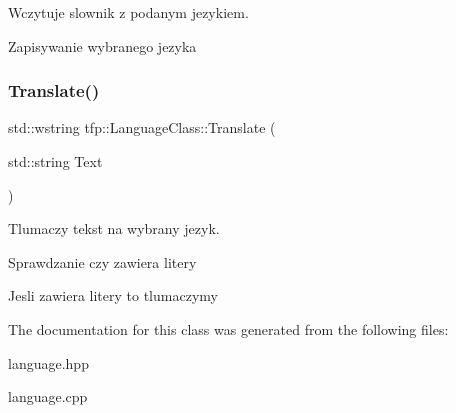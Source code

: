 Wczytuje slownik z podanym jezykiem. 

Zapisywanie wybranego jezyka \mbox{\label{classtfp_1_1_language_class_a8b0c58a37384663539c7ef40388521c1}} 
\subsubsection{\texorpdfstring{Translate()}{Translate()}}
{\footnotesize\ttfamily std\+::wstring tfp\+::\+Language\+Class\+::\+Translate (\begin{DoxyParamCaption}\item[{std\+::string}]{Text }\end{DoxyParamCaption})}



Tlumaczy tekst na wybrany jezyk. 

Sprawdzanie czy zawiera litery

Jesli zawiera litery to tlumaczymy 

The documentation for this class was generated from the following files\+:\begin{DoxyCompactItemize}
\item 
language.\+hpp\item 
language.\+cpp\end{DoxyCompactItemize}
